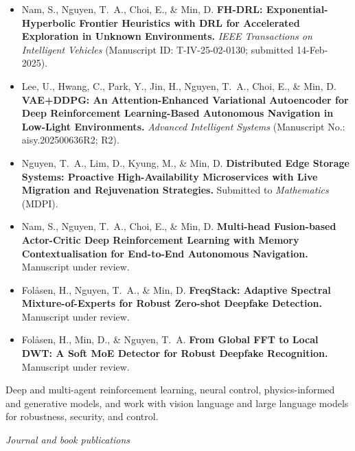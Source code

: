 {
\begin{itemize}
  \item Nam, S., Nguyen, T.\ A., Choi, E., \& Min, D. 
    \textbf{FH-DRL: Exponential-Hyperbolic Frontier Heuristics with DRL for Accelerated Exploration in Unknown Environments.} 
    \textit{IEEE Transactions on Intelligent Vehicles} (Manuscript ID: T-IV-25-02-0130; submitted 14-Feb-2025).

  \item Lee, U., Hwang, C., Park, Y., Jin, H., Nguyen, T.\ A., Choi, E., \& Min, D. 
    \textbf{VAE+DDPG: An Attention-Enhanced Variational Autoencoder for Deep Reinforcement Learning-Based Autonomous Navigation in Low-Light Environments.} 
    \textit{Advanced Intelligent Systems} (Manuscript No.: aisy.202500636R2; R2).

  \item Nguyen, T.\ A., Lim, D., Kyung, M., \& Min, D. 
    \textbf{Distributed Edge Storage Systems: Proactive High-Availability Microservices with Live Migration and Rejuvenation Strategies.} 
    Submitted to \textit{Mathematics} (MDPI).

  \item Nam, S., Nguyen, T.\ A., Choi, E., \& Min, D. 
    \textbf{Multi-head Fusion-based Actor-Critic Deep Reinforcement Learning with Memory Contextualisation for End-to-End Autonomous Navigation.} 
    Manuscript under review.

  \item Fol{\aa}sen, H., Nguyen, T.\ A., \& Min, D. 
    \textbf{FreqStack: Adaptive Spectral Mixture-of-Experts for Robust Zero-shot Deepfake Detection.} 
    Manuscript under review.

  \item Fol{\aa}sen, H., Min, D., \& Nguyen, T.\ A. 
    \textbf{From Global FFT to Local DWT: A Soft MoE Detector for Robust Deepfake Recognition.} 
    Manuscript under review.
\end{itemize}
\bigskip






Deep and multi-agent reinforcement learning, neural control, physics-informed and generative models, and work with vision language and large language models for robustness, security, and control.

\textit{Journal and book publications}
\begin{pubenumerate}


\end{pubenumerate}}
